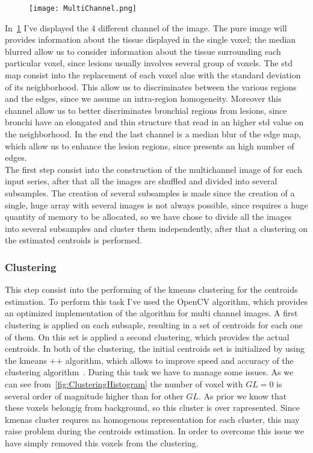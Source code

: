 		\begin{figure}[h]\label{fig:MultiChannel}
			\centering
				\texttt{[image: MultiChannel.png]}
			\caption{}
		\end{figure}
	
		In \figurename\,\ref{fig:MultiChannel} I've displayed the 4 different channel of the image. The pure image will provides information about the tissue displayed in the single voxel; the median blurred allow us to consider information about the tissue surrounding each particular voxel, since lesions usually involves several group of voxels. The std map consist into the replacement of each voxel alue with the standard deviation of its neighborhood. This allow us to discriminates between the various regions and the edges, since we assume an intra-region homogeneity. Moreover this channel allow us to better discriminates bronchial regions from lesions, since bronchi have an elongated and thin structure that read in an higher std value on the neighborhood. In the end the last channel is a median blur of the edge map, which allow us to enhance the lesion regions, since presents an high number of edges.\\
		
		The first step consist into the construction of the multichannel image of for each input series, after that all the images are shuffled and divided into several subsamples. The creation of several subsamples is made since the creation of a single, huge array with several images is not always possible, since requires a huge quantity of memory to be allocated, so we have chose to divide all the images into several subsamples and cluster them independently, after that a clustering on the estimated centroids is performed.\\

		
		\subsubsection*{Clustering} 
		
		This step consist into the performing of the kmeans clustering for the centroids estimation. To perform this task I've used the OpenCV algorithm, which provides an optimized implementation of the algorithm for multi channel images. A first clustering is applied on each subsaple, resulting in a set of centroids for each one of them. On this set is applied a second clustering, which provides the actual centroids. In both of the clustering, the initial centroids set is initialized by using the kmeans ++ algorithm, which allows to improve speed and accuracy of the clustering algorithm~\cite{Arthur2007}.
		During this task we have to manage some issues. As we can see from \figurename\,\ref{fig:ClusteringHistogram} the number of voxel with $GL = 0$  is several order of magnitude higher than for other $GL$. As prior we know that these voxels belongig from background, so this cluster is over rapresented. Since kmenas cluster requres na homogenous representation for each cluster, this may raise problem during the centroids estimation. In order to overcome this issue we have simply removed this voxels from the clustering.  
		

